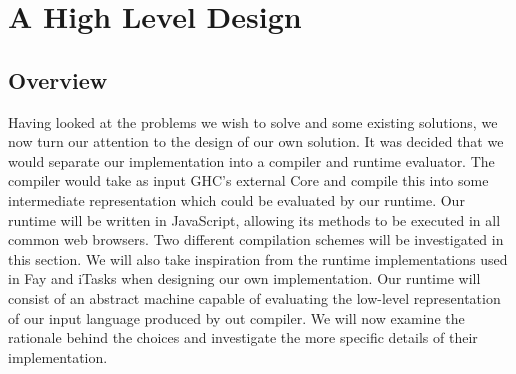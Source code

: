 
\section{A High Level Design}
\subsection{Overview}
Having looked at the problems we wish to solve and some existing solutions, we
now turn our attention to the design of our own solution. It was decided
that we would separate our implementation into a compiler and runtime evaluator. The
compiler would take as input GHC's external Core and compile this into some
intermediate representation which could be evaluated by our runtime. Our
runtime will be written in JavaScript, allowing its methods to be executed in
all common web browsers. Two different compilation schemes will be investigated
in this section. We will also take inspiration from the runtime implementations
used in Fay and iTasks when designing our own implementation. Our runtime will
consist of an abstract machine capable of evaluating the low-level representation
of our input language produced by out compiler. We will now examine the rationale
behind the choices and investigate the more specific details of their implementation.

